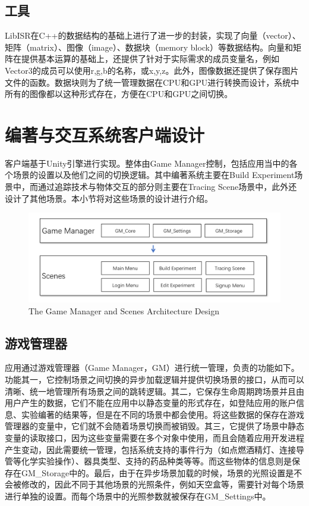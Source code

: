 \subsection{工具}

LibISR在C++的数据结构的基础上进行了进一步的封装，实现了向量（vector）、矩阵（matrix）、图像（image）、数据块（memory block）等数据结构。向量和矩阵在提供基本运算的基础上，还提供了针对于实际需求的成员变量名，例如Vector3的成员可以使用r,g,b的名称，或x,y,z。此外，图像数据还提供了保存图片文件的函数。数据块则为了统一管理数据在CPU和GPU进行转换而设计，系统中所有的图像都以这种形式存在，方便在CPU和GPU之间切换。

\section{编著与交互系统客户端设计}
客户端基于Unity引擎进行实现。整体由Game Manager控制，包括应用当中的各个场景的设置以及他们之间的切换逻辑。其中编著系统主要在Build Experiment场景中，而通过追踪技术与物体交互的部分则主要在Tracing Scene场景中，此外还设计了其他场景。本小节将对这些场景的设计进行介绍。

\begin{figure}[!htp]
  \centering
  \includegraphics[width=12cm]{figure/GMarc.png}
    {The Game Manager and Scenes Architecture Design}
 \label{fig:gm}
\end{figure}

\subsection{游戏管理器}
应用通过游戏管理器（Game Manager，GM）进行统一管理，负责的功能如下。
功能其一，它控制场景之间切换的异步加载逻辑并提供切换场景的接口，从而可以清晰、统一地管理所有场景之间的跳转逻辑。其二，它保存生命周期跨场景并且由用户产生的数据，它们不能在应用中以静态变量的形式存在，如登陆应用的账户信息、实验编著的结果等，但是在不同的场景中都会使用。将这些数据的保存在游戏管理器的变量中，它们就不会随着场景切换而被销毁。其三，它提供了场景中静态变量的读取接口，因为这些变量需要在多个对象中使用，而且会随着应用开发进程产生变动，因此需要统一管理，包括系统支持的事件行为（如点燃酒精灯、连接导管等化学实验操作）、器具类型、支持的药品种类等等。而这些物体的信息则是保存在GM\_Storage中的。最后，由于在异步场景加载的时候，场景的光照设置是不会被修改的，因此不同于其他场景的光照条件，例如天空盒等，需要针对每个场景进行单独的设置。而每个场景中的光照参数就被保存在GM\_Settings中。

